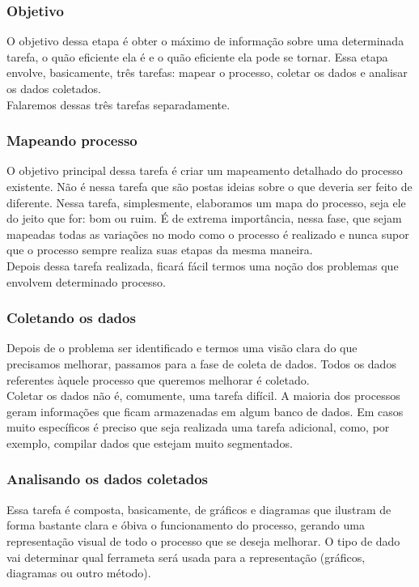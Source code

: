 \documentclass{abnt}
\begin{document}
					\subsubsection {Objetivo}
					O objetivo dessa etapa é obter o máximo de informação sobre uma determinada tarefa, 
					o quão eficiente ela é e o quão eficiente ela pode se tornar. Essa etapa envolve, 
					basicamente, três tarefas: mapear o processo, coletar os dados e analisar os dados coletados.
					\\
					Falaremos dessas três tarefas separadamente.
					\subsubsection {Mapeando processo}
					O objetivo principal dessa tarefa é criar um mapeamento detalhado do processo existente.
					Não é nessa tarefa que são postas ideias sobre o que deveria ser feito de diferente. 
					Nessa tarefa, simplesmente, elaboramos um mapa do processo, seja ele do jeito que for: bom ou ruim.
					É de extrema importância, nessa fase, que sejam mapeadas todas as variações no modo como o processo é realizado e 
					nunca supor que o processo sempre realiza suas etapas da mesma maneira.
					\\
					Depois dessa tarefa realizada, ficará fácil termos uma noção dos problemas que envolvem determinado processo.
					\subsubsection {Coletando os dados}
					Depois de o problema ser identificado e termos uma visão clara do que precisamos melhorar, passamos para a 
					fase de coleta de dados. Todos os dados referentes àquele processo que queremos melhorar é coletado.
					\\
					Coletar os dados não é, comumente, uma tarefa difícil. A maioria dos processos geram informações que 
					ficam armazenadas em algum banco de dados. Em casos muito específicos é preciso que seja realizada uma 
					tarefa adicional, como, por exemplo, compilar dados que estejam muito segmentados.
					
					\subsubsection {Analisando os dados coletados}
					Essa tarefa é composta, basicamente, de gráficos e diagramas que ilustram de forma bastante clara e óbiva 
					o funcionamento do processo, gerando uma representação visual de todo o processo que se deseja melhorar. O tipo de dado vai determinar qual 
					ferrameta será usada para a representação (gráficos, diagramas ou outro método).
\end{document}
